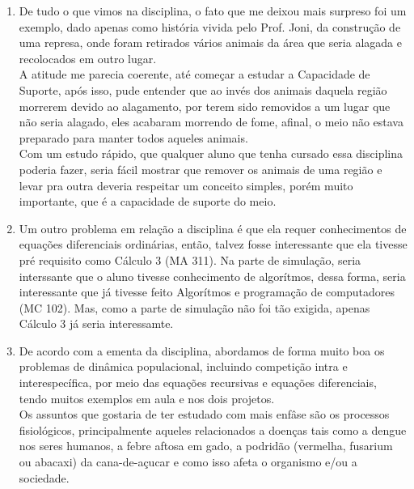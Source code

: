 \documentclass[a4paper]{article}
\begin{document}
\begin{enumerate}
\item
De tudo o que vimos na disciplina, o fato que me deixou mais surpreso foi um exemplo, dado apenas como hist\'oria vivida pelo Prof. Joni, da constru\c{c}\~ao de uma represa, onde foram retirados v\'arios animais da \'area que seria alagada e recolocados em outro lugar.
\\
A atitude me parecia coerente, at\'e come\c{c}ar a estudar a Capacidade de Suporte, ap\'os isso, pude entender que ao inv\'es dos animais daquela regi\~ao morrerem devido ao alagamento, por terem sido removidos a um lugar que n\~ao seria alagado, eles acabaram morrendo de fome, afinal, o meio n\~ao estava preparado para manter todos aqueles animais.
\\
Com um estudo r\'apido, que qualquer aluno que tenha cursado essa disciplina poderia fazer, seria f\'acil mostrar que remover os animais de uma regi\~ao e levar pra outra deveria respeitar um conceito simples, por\'em muito importante, que \'e a capacidade de suporte do meio.
\\
\item
Um outro problema em rela\c{c}\~ao a disciplina \'e que ela requer conhecimentos de equa\c{c}\~oes diferenciais ordin\'arias, ent\~ao, talvez fosse interessante que ela tivesse pr\'e requisito como C\'alculo 3 (MA 311). Na parte de simula\c{c}\~ao, seria interssante que o aluno tivesse conhecimento de algor\'itmos, dessa forma, seria interessante que j\'a tivesse feito Algor\'itmos e programa\c{c}\~ao de computadores (MC 102). Mas, como a parte de simula\c{c}\~ao n\~ao foi t\~ao exigida, apenas C\'alculo 3 j\'a seria interessamte. 
\\
\item
De acordo com a ementa da disciplina, abordamos de forma muito boa os problemas de din\^amica populacional, incluindo competi\c{c}\~ao intra e interespec\'ifica, por meio das equa\c{c}\~oes recursivas e equa\c{c}\~oes diferenciais, tendo muitos exemplos em aula e nos dois projetos. 
\\
Os assuntos que gostaria de ter estudado com mais enf\^ase s\~ao os processos fisiol\'ogicos, principalmente aqueles relacionados a doen\c{c}as tais como a dengue nos seres humanos, a febre aftosa em gado, a podrid\~ao (vermelha, fusarium ou abacaxi) da cana-de-a\c{c}ucar e como isso afeta o organismo e/ou a sociedade.
\\

\end{enumerate}
\end{document}
